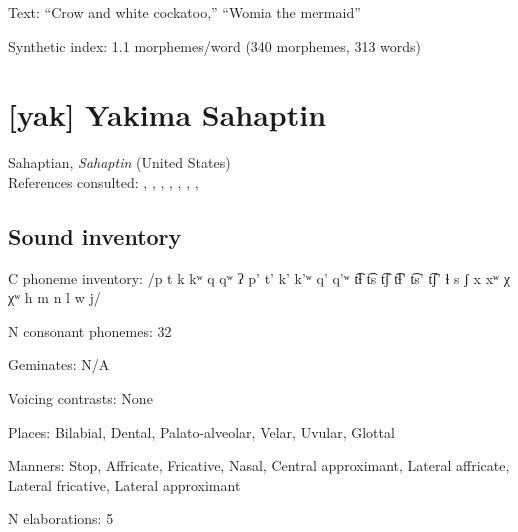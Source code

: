 {\begin{appendixdesc}

\item[Text:] “Crow and white cockatoo,” “Womia the mermaid” \citep[378--382]{Marmion2010}

\item[Synthetic index:] 1.1 morphemes/word (340 morphemes, 313 words)
\end{appendixdesc}
\section*{[yak] Yakima Sahaptin}  %
Sahaptian, \textit{Sahaptin} (United States)\medskip\\
References consulted: \citet{HargusBeavert2002}, \citet{HargusBeavert2005}, \citet{HargusBeavert2006}, \citet{Jansen2010}, \citet{Minthorn2005}, \citet{RigsbyRude1996}, \citet{Rude2009}, \citet{RudeReservation2014}

\subsection*{Sound inventory}
\begin{appendixdesc}

\item[C phoneme inventory:] /p t k kʷ q qʷ ʔ p’ t’ k’ k’ʷ q’ q’ʷ t͡ɬ t͡s t͡ʃ t͡ɬ’ t͡s’ t͡ʃ’ ɬ s ʃ x xʷ χ χʷ h m n l w j/

\item[N consonant phonemes:] 32

\item[Geminates:] N/A

\item[Voicing contrasts:] None

\item[Places:] Bilabial, Dental, Palato-alveolar, Velar, Uvular, Glottal

\item[Manners:] Stop, Affricate, Fricative, Nasal, Central approximant, Lateral affricate, Lateral fricative, Lateral approximant

\item[N elaborations:] 5


\end{appendixdesc}}
